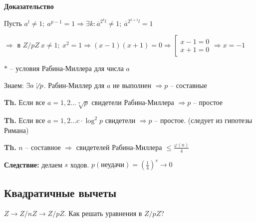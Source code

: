 \documentclass[14pt, letter paper]{article}
\DeclareRobustCommand{\divby}{%
  \mathrel{\text{\vbox{\baselineskip.65ex\lineskiplimit0pt\hbox{.}\hbox{.}\hbox{.}}}}%
}
\begin{document}
\begin{center}
    \textbf{Доказательство}
\end{center}

Пусть $a^l \neq 1;\ a^{p-1} = 1 \Rightarrow \exists k : \overline{a}^{2^kl} \neq 1;\ \overline{a}^{2^{k+1}l} = 1$

$\Rightarrow$ в $Z/pZ\ x \neq 1;\ x^2 = 1 \Rightarrow (x-1)(x+1) = 0 \Rightarrow \left[ \begin{gathered}
    x - 1 = 0 \\
    x + 1 = 0
\end{gathered} \right. \Rightarrow x = -1$

$*$ -- условия Рабина-Миллера для числа $a$

Знаем: $\exists a \not\divby p$. Рабин-Миллер для $a$ не выполнен $\Rightarrow p$ -- составные

\vspace{5mm}

\textbf{Th.} Если все $a = 1, 2 \ldots \sqrt[7]{p}$ свидетели Рабина-Миллера $\Rightarrow p$ -- простое

\textbf{Th.} Если все $a = 1, 2 \ldots c \cdot \log^2{p}$ свидетели $\Rightarrow p$ -- простое. (следует из гипотезы Римана)

\textbf{Th.} $n$ -- составное $\Rightarrow$ свидетелей Рабина-Миллера $\leq \frac{\varphi(n)}{4}$

\textbf{Следствие:} делаем $s$ ходов. $p(\text{неудачи}) = (\frac{1}{4})^s \rightarrow 0$

\begin{center}
    \section*{Квадратичные вычеты}
\end{center}

$Z \rightarrow Z/nZ \rightarrow Z/pZ$. Как решать уравнения в $Z/pZ$?
\end{document}

